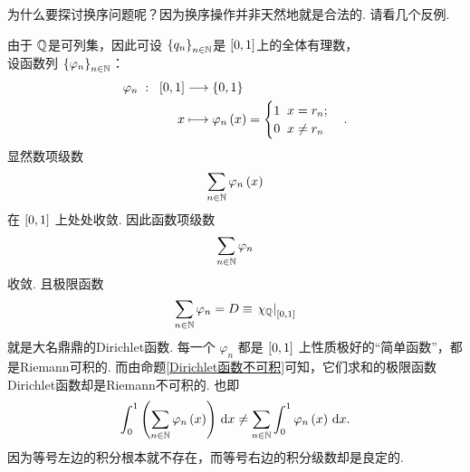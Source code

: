 为什么要探讨换序问题呢？因为换序操作并非天然地就是合法的. 请看几个反例.
\begin{example}\label{换序不合法例子}
    由于 $\mathbb{Q}$是可列集，因此可设 $\left\{ q_n \right\}_{n\in\mathbb{N}}$是 $\left[0,1\right]$上的全体有理数，\\
设函数列 $\left\{ \varphi_n \right\}_{n\in\mathbb{N}}$：
\begin{align*}
    \varphi_n \;:\;\; \left[0,1\right] &\longrightarrow \left\{ 0,1 \right\} \\
    x &\longmapsto \varphi_n\left( x \right) = \begin{cases}
        1 \;\; x=r_n ; \\
        0 \;\; x\neq r_n
    \end{cases}.
\end{align*}
显然数项级数 \[   \sum_{n\in\mathbb{N}} \varphi_n\left(x\right)  \] 在 $\left[0,1\right]$ 上处处收敛. 因此函数项级数 \[   \sum_{n\in\mathbb{N}} \varphi_n   \] 收敛. 且极限函数 \[   \sum_{n\in\mathbb{N}} \varphi_n=D \equiv \left. \chi_{\mathbb{Q}} \right|_{\left[0,1\right]}  \] 就是大名鼎鼎的Dirichlet函数. 每一个 $\varphi_n$ 都是 $\left[0,1\right]$ 上性质极好的“简单函数”，都是Riemann可积的. 而由命题\ref{Dirichlet函数不可积}可知，它们求和的极限函数Dirichlet函数却是Riemann不可积的. 也即
\[   \int_0^1 \left( \sum_{n\in\mathbb{N}} \varphi_n\left(x\right) \right) \,\mathrm{d} x  \neq \sum_{n\in\mathbb{N}} \int_0^1 \varphi_n\left(x\right) \,\mathrm{d} x .    \]
因为等号左边的积分根本就不存在，而等号右边的积分级数却是良定的.
\end{example}

\begin{definition}\label{换序定义}
    
\end{definition}





